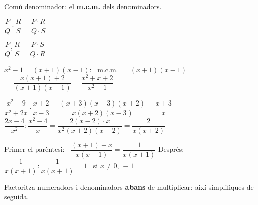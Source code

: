 \documentclass[11pt,a4paper]{article}
\newcommand{\comic}{\fontfamily{ComicNeue-TLF}\selectfont}
\newcommand{\nota}[1]{{\comic\small\color{fmex!85!black}#1}}
\begin{document}
\vfill
\begin{tcbraster}[raster columns=3,raster equal height,raster column skip=8pt]
\begin{tcolorbox}[fmbase,colback=fmdefbg,colframe=fmdef,coltitle=white,title={Suma i resta}]
Comú denominador: el \textbf{m.c.m.} dels denominadors.
\end{tcolorbox}
\begin{tcolorbox}[fmbase,colback=fmdefbg,colframe=fmdef,coltitle=white,title={Producte},before upper=\centering]
$\dfrac PQ\cdot\dfrac RS=\dfrac{P\cdot R}{Q\cdot S}$
\end{tcolorbox}
\begin{tcolorbox}[fmbase,colback=fmdefbg,colframe=fmdef,coltitle=white,title={Quocient},before upper=\centering]
$\dfrac PQ:\dfrac RS=\dfrac{P\cdot S}{Q\cdot R}$
\end{tcolorbox}
\end{tcbraster}

\vfill
\begin{exemple}
$x^2-1=(x+1)(x-1)$: \ m.c.m. $=(x+1)(x-1)$ \qquad $=\dfrac{x(x+1)+2}{(x+1)(x-1)}=\boxed{\dfrac{x^2+x+2}{x^2-1}}$
\end{exemple}

\vfill
\begin{exemple}
$\dfrac{x^2-9}{x^2+2x}\cdot\dfrac{x+2}{x-3}=\dfrac{(x+3)(x-3)(x+2)}{x(x+2)(x-3)}=\boxed{\dfrac{x+3}{x}}$ \qquad
$\dfrac{2x-4}{x^2}:\dfrac{x^2-4}{x}=\dfrac{2(x-2)\cdot x}{x^2(x+2)(x-2)}=\boxed{\dfrac{2}{x(x+2)}}$
\end{exemple}

\vfill
\begin{exemple}
Primer el parèntesi: \ $\dfrac{(x+1)-x}{x(x+1)}=\dfrac{1}{x(x+1)}$ \qquad Després: \ $\dfrac{1}{x(x+1)}:\dfrac{1}{x(x+1)}=\boxed{1}$ \ \nota{si $x\neq0,\,-1$}
\end{exemple}

\vfill
\begin{truc}
Factoritza numeradors i denominadors \textbf{abans} de multiplicar: així simplifiques de seguida.
\end{truc}
\end{document}
